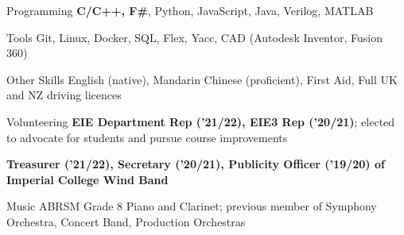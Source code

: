 

\begin{cvskills}


  \cvskill
    {Programming} %
    {\textbf{C/C++, F\#}, Python, JavaScript, Java, Verilog, MATLAB} %

  \cvskill
    {Tools} %
    {Git, Linux, Docker, SQL, Flex, Yacc, CAD (Autodesk Inventor, Fusion 360)} %

  \cvskill
    {Other Skills}
    {English (native), Mandarin Chinese (proficient), First Aid, Full UK and NZ driving licences}

  \cvskill
    {Volunteering} %
    {\textbf{EIE Department Rep ('21/22), EIE3 Rep ('20/21)}; elected to advocate for students and pursue course improvements} %

  \cvskill
    {} %
    {\textbf{Treasurer ('21/22), Secretary ('20/21), Publicity Officer ('19/20) of Imperial College Wind Band}} %



  \cvskill
    {Music} %
    {ABRSM Grade 8 Piano and Clarinet; previous member of Symphony Orchestra, Concert Band, Production Orchestras} %


\end{cvskills}
